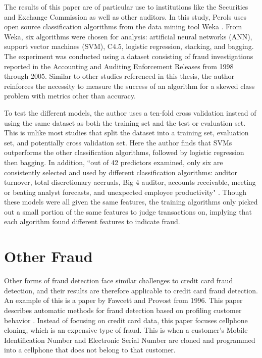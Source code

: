 \documentclass[midd]{thesis}
\begin{document}
The results of this paper are of particular use to institutions like the Securities and Exchange Commission as well as other auditors. In this study, Perols uses open source classification algorithms from the data mining tool Weka \cite{Perols2011}. From Weka, six algorithms were chosen for analysis: artificial neural networks (ANN), support vector machines (SVM), C4.5, logistic regression, stacking, and bagging. The experiment was conducted using a dataset consisting of fraud investigations reported in the Accounting and Auditing Enforcement Releases from 1998 through 2005. Similar to other studies referenced in this thesis, the author reinforces the necessity to measure the success of an algorithm for a skewed class problem with metrics other than accuracy. 

To test the different models, the author uses a ten-fold cross validation instead of using the same dataset as both the training set and the test or evaluation set. This is unlike most studies that split the dataset into a training set, evaluation set, and potentially cross validation set. Here the author finds that SVMs outperforms the other classification algorithms, followed by logistic regression then bagging. In addition, ``out of 42 predictors examined, only six are consistently selected and used by different classification algorithms: auditor turnover, total discretionary accruals, Big 4 auditor, accounts receivable, meeting or beating analyst forecasts, and unexpected employee productivity" \cite{Perols2011}. Though these models were all given the same features, the training algorithms only picked out a small portion of the same features to judge transactions on, implying that each algorithm found different features to indicate fraud. 

\section{Other Fraud}

Other forms of fraud detection face similar challenges to credit card fraud detection, and their results are therefore applicable to credit card fraud detection. An example of this is a paper by Fawcett and Provost from 1996. This paper describes automatic methods for fraud detection based on profiling customer behavior \cite{Fawcett1996}. Instead of focusing on credit card data, this paper focuses cellphone cloning, which is an expensive type of fraud. This is when a customer's Mobile Identification Number and Electronic Serial Number are cloned and programmed into a cellphone that does not belong to that customer. 
\end{document}
